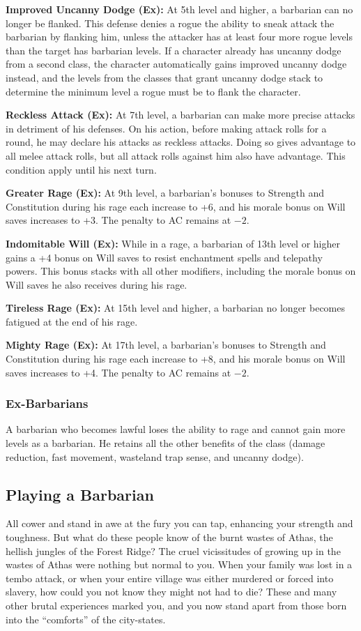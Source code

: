 \textbf{Improved Uncanny Dodge (Ex):} At 5th level and higher, a barbarian can no longer be flanked. This defense denies a rogue the ability to sneak attack the barbarian by flanking him, unless the attacker has at least four more rogue levels than the target has barbarian levels. If a character already has uncanny dodge from a second class, the character automatically gains improved uncanny dodge instead, and the levels from the classes that grant uncanny dodge stack to determine the minimum level a rogue must be to flank the character.

\textbf{Reckless Attack (Ex):} At 7th level, a barbarian can make more precise attacks in detriment of his defenses. On his action, before making attack rolls for a round, he may declare his attacks as reckless attacks. Doing so gives advantage to all melee attack rolls, but all attack rolls against him also have advantage. This condition apply until his next turn.

\textbf{Greater Rage (Ex):} At 9th level, a barbarian's bonuses to Strength and Constitution during his rage each increase to +6, and his morale bonus on Will saves increases to +3. The penalty to AC remains at $-2$.

\textbf{Indomitable Will (Ex):} While in a rage, a barbarian of 13th level or higher gains a +4 bonus on Will saves to resist enchantment spells and telepathy powers. This bonus stacks with all other modifiers, including the morale bonus on Will saves he also receives during his rage.

\textbf{Tireless Rage (Ex):} At 15th level and higher, a barbarian no longer becomes fatigued at the end of his rage.

\textbf{Mighty Rage (Ex):} At 17th level, a barbarian's bonuses to Strength and Constitution during his rage each increase to +8, and his morale bonus on Will saves increases to +4. The penalty to AC remains at $-2$.

\subsubsection{Ex-Barbarians}
A barbarian who becomes lawful loses the ability to rage and cannot gain more levels as a barbarian. He retains all the other benefits of the class (damage reduction, fast movement, wasteland trap sense, and uncanny dodge).


\subsection{Playing a Barbarian}
All cower and stand in awe at the fury you can tap, enhancing your strength and toughness. But what do these people know of the burnt wastes of Athas, the hellish jungles of the Forest Ridge? The cruel vicissitudes of growing up in the wastes of Athas were nothing but normal to you. When your family was lost in a tembo attack, or when your entire village was either murdered or forced into slavery, how could you not know they might not had to die? These and many other brutal experiences marked you, and you now stand apart from those born into the ``comforts'' of the city-states.

